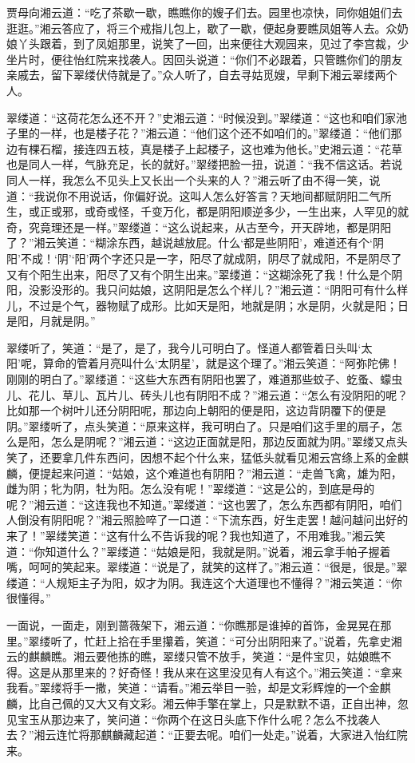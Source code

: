 贾母向湘云道：“吃了茶歇一歇，瞧瞧你的嫂子们去。园里也凉快，同你姐姐们去逛逛。”湘云答应了，将三个戒指儿包上，歇了一歇，便起身要瞧凤姐等人去。众奶娘丫头跟着，到了凤姐那里，说笑了一回，出来便往大观园来，见过了李宫裁，少坐片时，便往怡红院来找袭人。因回头说道：“你们不必跟着，只管瞧你们的朋友亲戚去，留下翠缕伏侍就是了。”众人听了，自去寻姑觅嫂，早剩下湘云翠缕两个人。

翠缕道：“这荷花怎么还不开？”史湘云道：“时候没到。”翠缕道：“这也和咱们家池子里的一样，也是楼子花？”湘云道：“他们这个还不如咱们的。”翠缕道：“他们那边有棵石榴，接连四五枝，真是楼子上起楼子，这也难为他长。”史湘云道：“花草也是同人一样，气脉充足，长的就好。”翠缕把脸一扭，说道：“我不信这话。若说同人一样，我怎么不见头上又长出一个头来的人？”湘云听了由不得一笑，说道：“我说你不用说话，你偏好说。这叫人怎么好答言？天地间都赋阴阳二气所生，或正或邪，或奇或怪，千变万化，都是阴阳顺逆多少，一生出来，人罕见的就奇，究竟理还是一样。”翠缕道：“这么说起来，从古至今，开天辟地，都是阴阳了？”湘云笑道：“糊涂东西，越说越放屁。什么‘都是些阴阳’，难道还有个‘阴阳’不成！‘阴’‘阳’两个字还只是一字，阳尽了就成阴，阴尽了就成阳，不是阴尽了又有个阳生出来，阳尽了又有个阴生出来。”翠缕道：“这糊涂死了我！什么是个阴阳，没影没形的。我只问姑娘，这阴阳是怎么个样儿？”湘云道：“阴阳可有什么样儿，不过是个气，器物赋了成形。比如天是阳，地就是阴；水是阴，火就是阳；日是阳，月就是阴。”

翠缕听了，笑道：“是了，是了，我今儿可明白了。怪道人都管着日头叫‘太阳’呢，算命的管着月亮叫什么‘太阴星’，就是这个理了。”湘云笑道：“阿弥陀佛！刚刚的明白了。”翠缕道：“这些大东西有阴阳也罢了，难道那些蚊子、虼蚤、蠓虫儿、花儿、草儿、瓦片儿、砖头儿也有阴阳不成？”湘云道：“怎么有没阴阳的呢？比如那一个树叶儿还分阴阳呢，那边向上朝阳的便是阳，这边背阴覆下的便是阴。”翠缕听了，点头笑道：“原来这样，我可明白了。只是咱们这手里的扇子，怎么是阳，怎么是阴呢？”湘云道：“这边正面就是阳，那边反面就为阴。”翠缕又点头笑了，还要拿几件东西问，因想不起个什么来，猛低头就看见湘云宫绦上系的金麒麟，便提起来问道：“姑娘，这个难道也有阴阳？”湘云道：“走兽飞禽，雄为阳，雌为阴；牝为阴，牡为阳。怎么没有呢！”翠缕道：“这是公的，到底是母的呢？”湘云道：“这连我也不知道。”翠缕道：“这也罢了，怎么东西都有阴阳，咱们人倒没有阴阳呢？”湘云照脸啐了一口道：“下流东西，好生走罢！越问越问出好的来了！”翠缕笑道：“这有什么不告诉我的呢？我也知道了，不用难我。”湘云笑道：“你知道什么？”翠缕道：“姑娘是阳，我就是阴。”说着，湘云拿手帕子握着嘴，呵呵的笑起来。翠缕道：“说是了，就笑的这样了。”湘云道：“很是，很是。”翠缕道：“人规矩主子为阳，奴才为阴。我连这个大道理也不懂得？”湘云笑道：“你很懂得。”

一面说，一面走，刚到蔷薇架下，湘云道：“你瞧那是谁掉的首饰，金晃晃在那里。”翠缕听了，忙赶上拾在手里攥着，笑道：“可分出阴阳来了。”说着，先拿史湘云的麒麟瞧。湘云要他拣的瞧，翠缕只管不放手，笑道：“是件宝贝，姑娘瞧不得。这是从那里来的？好奇怪！我从来在这里没见有人有这个。”湘云笑道：“拿来我看。”翠缕将手一撒，笑道：“请看。”湘云举目一验，却是文彩辉煌的一个金麒麟，比自己佩的又大又有文彩。湘云伸手擎在掌上，只是默默不语，正自出神，忽见宝玉从那边来了，笑问道：“你两个在这日头底下作什么呢？怎么不找袭人去？”湘云连忙将那麒麟藏起道：“正要去呢。咱们一处走。”说着，大家进入怡红院来。

